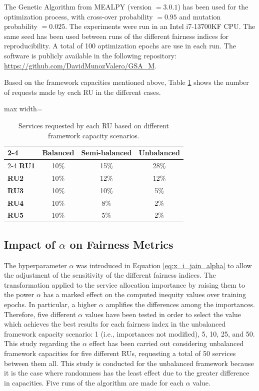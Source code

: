\documentclass[preprint,12pt]{elsarticle}
\begin{document}
The Genetic Algorithm from MEALPY (version $ =3.0.1 $) has been used for the optimization process, with cross-over probability $ = 0.95 $ and mutation probability $ = 0.025 $. The experiments were run in an Intel i7-13700KF CPU. The same seed has been used between runs of the different fairness indices for reproducibility. A total of 100 optimization epochs are use in each run. The software is publicly available in the following repository: \url{https://github.com/DavidMunozValero/GSA_M}.

Based on the framework capacities mentioned above, Table \ref{tab:requests} shows the number of requests made by each RU in the different cases.

\begin{table}[htbp]
\centering
\begin{adjustbox}{max width=\textwidth}
\begin{tabular}{|l|c|c|c|}
\cline{2-4}
\multicolumn{1}{c|}{} & \textbf{Balanced} & \textbf{Semi-balanced} & \textbf{Unbalanced} \\
\cline{2-4} \hline
\textbf{RU1} & 10\% & 15\% & 28\% \\ \hline
\textbf{RU2} & 10\% & 12\% & 12\% \\ \hline
\textbf{RU3} & 10\% & 10\% & 5\% \\ \hline
\textbf{RU4} & 10\% & 8\% & 2\% \\ \hline
\textbf{RU5} & 10\% & 5\% & 2\% \\ \hline
\end{tabular}
\end{adjustbox}
\caption{Services requested by each RU based on different framework capacity scenarios.}
\label{tab:requests}
\end{table}

\subsection{Impact of $\alpha$ on Fairness Metrics}

The hyperparameter $\alpha$ was introduced in Equation \ref{eq:x_i_jain_alpha} to allow the adjustment of the sensitivity of the different fairness indices. The transformation applied to the service allocation importance by raising them to the power $\alpha$ has a marked effect on the computed inequity values over training epochs. In particular, a higher $\alpha$ amplifies the differences among the importances. Therefore, five different $\alpha$ values have been tested in order to select the value which achieves the best results for each fairness index in the unbalanced framework capacity scenario: 1 (i.e., importances not modified), 5, 10, 25, and 50. This study regarding the $\alpha$ effect has been carried out considering unbalanced framework capacities for five different RUs, requesting a total of 50 services between them all. This study is conducted for the unbalanced framework because it is the case where randomness has the least effect due to the greater difference in capacities. Five runs of the algorithm are made for each $\alpha$ value.
\end{document}
